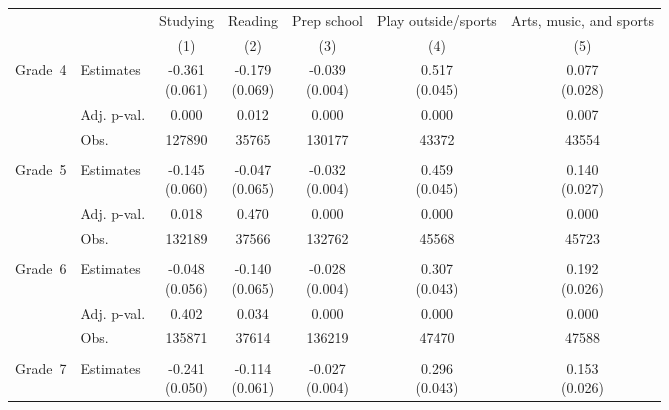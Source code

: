 \begin{tabular}{llccccc}
\hline \hline
 &  & Studying & Reading & Prep school & Play outside/sports & Arts, music, and sports \\
 &  & (1) & (2) & (3) & (4) & (5) \\
\hline
Grade~4 & Estimates & \makecell[tc]{-0.361\\(0.061)} & \makecell[tc]{-0.179\\(0.069)} & \makecell[tc]{-0.039\\(0.004)} & \makecell[tc]{0.517\\(0.045)} & \makecell[tc]{0.077\\(0.028)} \\
 & Adj. p-val. & 0.000 & 0.012 & 0.000 & 0.000 & 0.007 \\
 & Obs. & 127890 & 35765 & 130177 & 43372 & 43554 \\
 \\
Grade~5 & Estimates & \makecell[tc]{-0.145\\(0.060)} & \makecell[tc]{-0.047\\(0.065)} & \makecell[tc]{-0.032\\(0.004)} & \makecell[tc]{0.459\\(0.045)} & \makecell[tc]{0.140\\(0.027)} \\
 & Adj. p-val. & 0.018 & 0.470 & 0.000 & 0.000 & 0.000 \\
 & Obs. & 132189 & 37566 & 132762 & 45568 & 45723 \\
\\
Grade~6 & Estimates & \makecell[tc]{-0.048\\(0.056)} & \makecell[tc]{-0.140\\(0.065)} & \makecell[tc]{-0.028\\(0.004)} & \makecell[tc]{0.307\\(0.043)} & \makecell[tc]{0.192\\(0.026)} \\
 & Adj. p-val. & 0.402 & 0.034 & 0.000 & 0.000 & 0.000 \\
 & Obs. & 135871 & 37614 & 136219 & 47470 & 47588 \\
 \\
Grade~7 & Estimates & \makecell[tc]{-0.241\\(0.050)} & \makecell[tc]{-0.114\\(0.061)} & \makecell[tc]{-0.027\\(0.004)} & \makecell[tc]{0.296\\(0.043)} & \makecell[tc]{0.153\\(0.026)} \\

\end{tabular}
